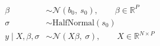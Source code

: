 \begin{align}
  \beta &\sim \mathcal{N}(b_0,\ s_0), \qquad \beta \in \mathbb{R}^{P} \\
  \sigma &\sim \mathrm{HalfNormal}(s_0) \\
  y \mid X, \beta, \sigma &\sim \mathcal{N}(X\beta,\ \sigma), \qquad X \in \mathbb{R}^{N \times P}
\end{align}
